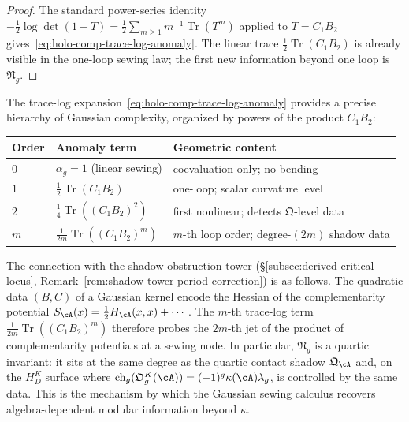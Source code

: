 \begin{proof}
The standard power-series identity
$-\tfrac{1}{2}\log\det(1 - T) =
\tfrac{1}{2}\sum_{m \geq 1} m^{-1}\operatorname{Tr}(T^m)$
applied to $T = C_1 B_2$
gives~\eqref{eq:holo-comp-trace-log-anomaly}. The linear trace
$\tfrac{1}{2}\operatorname{Tr}(C_1 B_2)$ is already visible in the
one-loop sewing law; the first new information beyond one loop is
$\mathfrak{N}_g$.
\end{proof}

\begin{remark}
\label{rem:holo-comp-hierarchy}
The trace-log expansion~\eqref{eq:holo-comp-trace-log-anomaly}
provides a precise hierarchy of Gaussian complexity, organized
by powers of the product $C_1 B_2$:
\begin{center}
\begin{tabular}{@{}lll@{}}
\toprule
Order & Anomaly term & Geometric content \\
\midrule
$0$ & $\alpha_g = 1$ (linear sewing)
 & coevaluation only; no bending \\
$1$ & $\tfrac{1}{2}\operatorname{Tr}(C_1 B_2)$
 & one-loop; scalar curvature level \\
$2$ & $\tfrac{1}{4}\operatorname{Tr}((C_1 B_2)^2)$
 & first nonlinear; detects $\mathfrak{Q}$-level data \\
$m$ & $\tfrac{1}{2m}\operatorname{Tr}((C_1 B_2)^m)$
 & $m$-th loop order; degree-$(2m)$ shadow data \\
\bottomrule
\end{tabular}
\end{center}
The connection with the shadow obstruction tower
(\S\ref{subsec:derived-critical-locus},
Remark~\ref{rem:shadow-tower-period-correction}) is as follows.
The quadratic data $(B, C)$ of a Gaussian kernel encode the
Hessian of the complementarity potential
$S_{\cA}(x) = \tfrac{1}{2} H_{\cA}(x,x) + \cdots$\,.
The $m$-th trace-log term
$\tfrac{1}{2m}\operatorname{Tr}((C_1 B_2)^m)$ therefore probes the
$2m$-th jet of the product of complementarity potentials at a
sewing node. In particular, $\mathfrak{N}_g$ is a quartic
invariant: it sits at the same degree as the quartic contact
shadow $\mathfrak{Q}_{\cA}$ and, on the $H_D^K$ surface where
\(\operatorname{ch}_g(\mathfrak O_g^K(\cA))=
(-1)^g\kappa(\cA)\lambda_g\), is controlled by the same data.
This is the mechanism by which the Gaussian sewing calculus
recovers algebra-dependent modular information beyond $\kappa$.
\end{remark}

